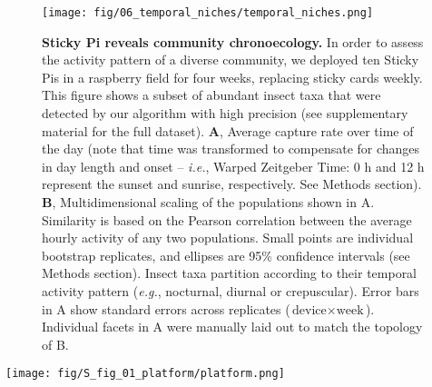 \documentclass[12pt]{article}
\begin{document}
	\pagebreak

	\begin{figure}[ht]
		\centering
		\texttt{[image: fig/06\_temporal\_niches/temporal\_niches.png]}
		\caption{\textbf{Sticky Pi reveals community chronoecology.} In order to assess the activity pattern of a diverse community, we deployed ten Sticky Pis in a raspberry field for four weeks, replacing sticky cards weekly. This figure shows a subset of abundant insect taxa that were detected by our algorithm with high precision (see supplementary material for the full dataset). \textbf{A}, Average capture rate over time of the day (note that time was transformed to compensate for changes in day length and onset – \emph{i.e.}, Warped Zeitgeber Time: 0 h and 12 h represent the sunset and sunrise, respectively. See Methods section). \textbf{B}, Multidimensional scaling of the populations shown in A. Similarity is based on the Pearson correlation between the average hourly activity of any two populations. Small points are individual bootstrap replicates, and ellipses are 95\% confidence intervals (see Methods section). Insect taxa partition according to their temporal activity pattern (\emph{e.g.}, nocturnal, diurnal or crepuscular). Error bars in A show standard errors across replicates ($\text{device} \times{} \text{week}$). Individual facets in A were manually laid out to match the topology of B.}
		\label{fig:06}
	\end{figure}
	\pagebreak

	
	\begin{supfig}[ht]
		\centering
		\texttt{[image: fig/S\_fig\_01\_platform/platform.png]}
		\caption{\textbf{The Sticky Pi platform.} Sticky Pi devices acquire images that are retrieved using a “data harvester” – based on another Raspberry Pi. The data from the harvesters are then incrementally uploaded to a centralised, per-laboratory, database. Images are then automatically pre-processed (the Universal Insect Detector is applied). Users and maintainers can visualise data in real-time using our Rshiny web application. The remote Application Programming Interface (API) is secured behind an Nginx server, and the images are saved on an S3 server. All components of the server are deployed as individual interacting Docker containers. API documentation and source code are available on \href{https://doc.sticky-pi.com/web-server.html}{https://doc.sticky-pi.com/web-server.html}.}
		\label{supfig:01}
	\end{supfig}
	\pagebreak
\end{document}
